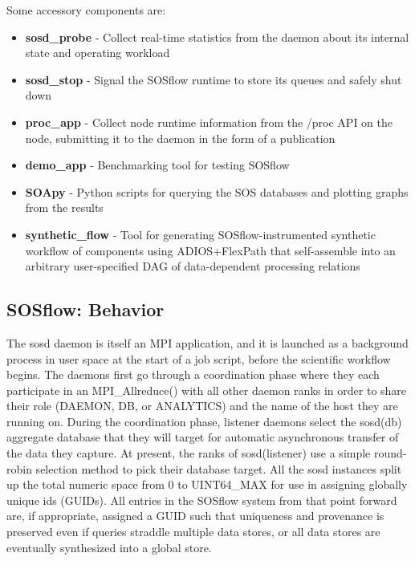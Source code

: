 Some accessory components are:
%
\begin{itemize}
    \item \textbf{sosd\_probe} - Collect real-time statistics from the daemon about
      its internal state and operating workload
    \item \textbf{sosd\_stop} - Signal the SOSflow runtime to store its queues and
      safely shut down
    \item \textbf{proc\_app} - Collect node runtime information from
      the /proc API on the node, submitting it to the daemon in the
      form of a publication
    \item \textbf{demo\_app} - Benchmarking tool for testing SOSflow
    \item \textbf{SOApy} - Python scripts for querying the SOS databases and plotting
      graphs from the results
    \item \textbf{synthetic\_flow} - Tool for generating SOSflow-instrumented
      synthetic workflow of components using ADIOS+FlexPath
      that self-assemble into an arbitrary  user-specified DAG of
      data-dependent processing relations
\end{itemize}

\subsection{SOSflow: Behavior}
%
The sosd daemon is itself an MPI application, and it is launched as a
background process in user space at the start of a job script, before
the scientific workflow begins.
%
The daemons first go through a coordination phase where they each
participate in an MPI\_Allreduce() with all other daemon ranks in
order to share their role (DAEMON, DB, or ANALYTICS) and the name of
the host they are running on.
%
During the coordination phase, listener daemons select the sosd(db)
aggregate database that they will target for automatic asynchronous
transfer of the data they capture.
%
At present, the ranks of sosd(listener) use a simple round-robin
selection method to pick their database target.
%
All the sosd instances split up the total numeric space from 0 to
UINT64\_MAX for use in assigning globally unique ids (GUIDs).
%
All entries in the SOSflow system from that point forward are, if
appropriate, assigned a GUID such that uniqueness and provenance is
preserved even if queries straddle multiple data stores, or all data
stores are eventually synthesized into a global store.

